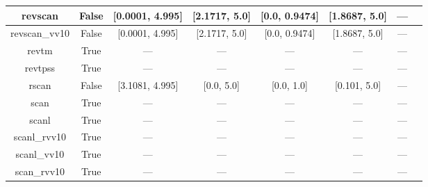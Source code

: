 \begin{tabular}{|c|c|c|c|c|c|c|l|}
       revscan &                 False &   [0.0001, 4.995] &     [2.1717, 5.0] &     [0.0, 0.9474] &  [1.8687, 5.0] &         --- &                                                               \cite{Mezei2018_2469} \\ \hline
 revscan\_vv10 &                 False &   [0.0001, 4.995] &     [2.1717, 5.0] &     [0.0, 0.9474] &  [1.8687, 5.0] &         --- &                                                               \cite{Mezei2018_2469} \\ \hline
         revtm &                  True &               --- &               --- &               --- &            --- &         --- &                                                                \cite{Jana2019_6356} \\ \hline
       revtpss &                  True &               --- &               --- &               --- &            --- &         --- &                                      \cite{Perdew2009_026403,Perdew2009_026403_err} \\ \hline
         rscan &                 False &   [3.1081, 4.995] &        [0.0, 5.0] &        [0.0, 1.0] &   [0.101, 5.0] &         --- &                                                            \cite{Bartok2019_161101} \\ \hline
          scan &                  True &               --- &               --- &               --- &            --- &         --- &                                                               \cite{Sun2015_036402} \\ \hline
         scanl &                  True &               --- &               --- &               --- &            --- &         --- &                             \cite{Mejia2017_052512,Mejia2018_115161,Sun2015_036402} \\ \hline
  scanl\_rvv10 &                  True &               --- &               --- &               --- &            --- &         --- &                            \cite{Mejia2017_052512,Mejia2018_115161,Peng2016_041005} \\ \hline
   scanl\_vv10 &                  True &               --- &               --- &               --- &            --- &         --- &                     \cite{Mejia2017_052512,Mejia2018_115161,Brandenburg2016_115144} \\ \hline
   scan\_rvv10 &                  True &               --- &               --- &               --- &            --- &         --- &                                                              \cite{Peng2016_041005} \\ \hline

\end{tabular}
